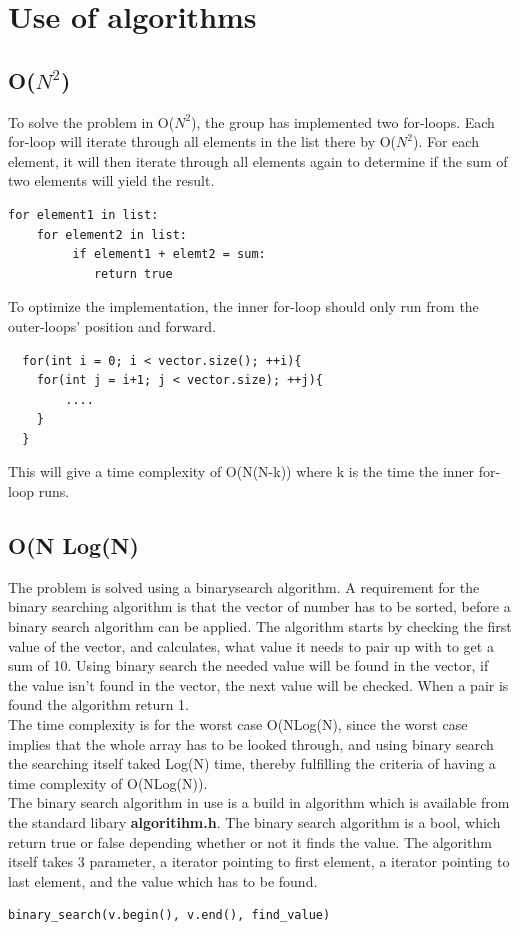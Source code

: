\section{Use of algorithms}
\subsection{O(\(N^{2}\))}
To solve the problem in O(\(N^{2}\)), the group has implemented two for-loops. Each for-loop will iterate through all elements in the list there by O(\(N^{2}\)). For each element, it will then iterate through all elements again to determine if the sum of two elements will yield the result.
\begin{lstlisting}
for element1 in list:
    for element2 in list:
         if element1 + elemt2 = sum:
            return true
\end{lstlisting}
To optimize the implementation, the inner for-loop should only run from the outer-loops' position and forward.
\begin{lstlisting}
  for(int i = 0; i < vector.size(); ++i){
  	for(int j = i+1; j < vector.size); ++j){
  		....
  	}
  }
\end{lstlisting}

This will give a time complexity of O(N(N-k)) where k is the time the inner for-loop runs.
\subsection{O(N Log(N)}
The problem is solved using a binarysearch algorithm. A requirement for the binary searching algorithm is that the vector of number has to be sorted, before a binary search algorithm can be applied. 
The algorithm starts by checking the first value of the vector, and calculates, what value it needs to pair up with to get a sum of 10.  Using binary search the needed value will be found in the vector, if the value isn't found in the vector, the next value will be checked.  When a pair is found the algorithm return 1. 
\\

The time complexity is for the worst case O(NLog(N), since the worst case implies that the whole array has to be looked through, and using binary search the  searching itself taked Log(N) time, thereby fulfilling the criteria of having a time complexity of O(NLog(N)).    
\\

The binary search algorithm in use is a build in algorithm which is available from the standard libary \textbf{algoritihm.h}. The binary search algorithm is a bool, which return true or false depending whether or not it finds the value.  The algorithm itself takes 3 parameter, 	a iterator pointing to first element, a iterator pointing to last element, and the value which has to be found. 
\begin{lstlisting}
binary_search(v.begin(), v.end(), find_value)
\end{lstlisting}
\newpage
